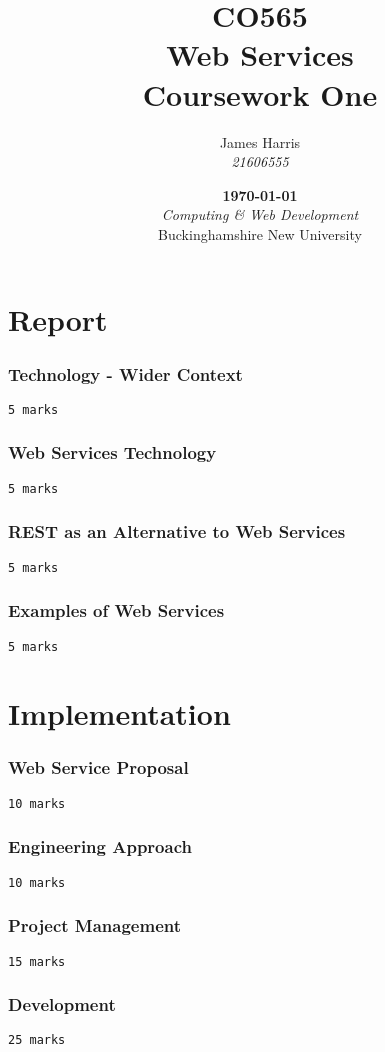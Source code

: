 \documentclass{report}
\title{
    \Large CO565\\
    Web Services\vspace*{.65cm}\\
    \huge Coursework One\vfill
}
\author{
    James Harris\\
    \textit{21606555}
}
\date{
    \vfill\textbf\today\\
    \vspace*{.75cm}\textit{Computing \& Web Development}\\
    Buckinghamshire New University
}
\begin{document}
    \maketitle
    \tableofcontents
    \part{Report}
    \section{Technology - Wider Context}
    \texttt{5 marks}
    \section{Web Services Technology}
    \texttt{5 marks}
    \section{REST as an Alternative to Web Services}
    \texttt{5 marks}
    \section{Examples of Web Services}
    \texttt{5 marks}

    \part{Implementation}
    \section{Web Service Proposal}
    \texttt{10 marks}
    \section{Engineering Approach}
    \texttt{10 marks}
    \section{Project Management}
    \texttt{15 marks}
    \section{Development}
    \texttt{25 marks}
    
\end{document}

